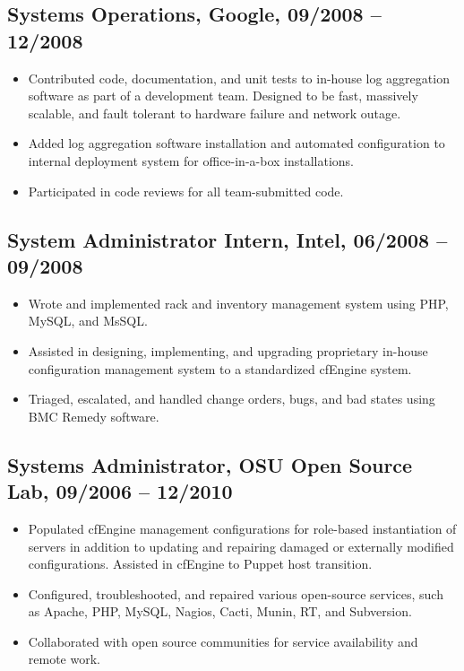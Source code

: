 \documentclass[a4paper,12pt]{report}
\begin{document}
\subsection*{Systems Operations, Google, 09/2008 -- 12/2008}
\begin{itemize}
\item Contributed code, documentation, and unit tests to in-house log aggregation software as part of a development team. Designed to be fast, massively scalable, and fault tolerant to hardware failure and network outage.
\item Added log aggregation software installation and automated configuration to internal deployment system for office-in-a-box installations.
\item Participated in code reviews for all team-submitted code.
\end{itemize}

\subsection*{System Administrator Intern, Intel, 06/2008 -- 09/2008}
\begin{itemize}
\item Wrote and implemented rack and inventory management system using PHP, MySQL, and MsSQL.
\item Assisted in designing, implementing, and upgrading proprietary in-house configuration management system to a standardized cfEngine system.
\item Triaged, escalated, and handled change orders, bugs, and bad states using BMC Remedy software.
\end{itemize}

\subsection*{Systems Administrator, OSU Open Source Lab, 09/2006 -- 12/2010}
\begin{itemize}
\item Populated cfEngine management configurations for role-based instantiation of servers in addition to updating and repairing damaged or externally modified configurations. Assisted in cfEngine to Puppet host transition.
\item Configured, troubleshooted, and repaired various open-source services, such as Apache, PHP, MySQL, Nagios, Cacti, Munin, RT, and Subversion.
\item Collaborated with open source communities for service availability and remote work.
\end{itemize}
\end{document}
